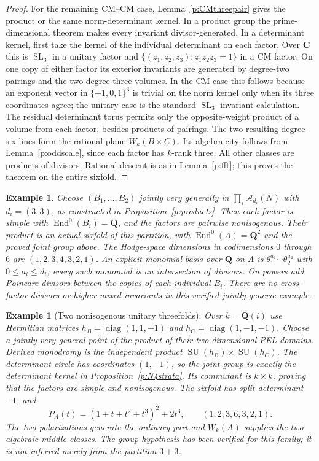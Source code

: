 \documentclass[10pt,reqno]{article}
\theoremstyle{emphasizedplain}
\theoremstyle{emphasizeddefinition}
\newtheorem{example}[theorem]{Example}
\theoremstyle{emphasizeddefinition}
\DeclareMathOperator{\End}{End}
\DeclareMathOperator{\SL}{SL}
\DeclareMathOperator{\SU}{SU}
\newcommand{\Q}{\mathbf Q}
\newcommand{\C}{\mathbf C}
\begin{document}
\begin{proof}
For the remaining CM--CM case, Lemma~\ref{p:CMthreepair} gives the
product or the same norm-determinant kernel. In a product group the
prime-dimensional theorem makes every invariant divisor-generated.
In a determinant kernel, first take the kernel of the individual
determinant on each factor. Over $\C$ this is $\SL_3$ in a unitary
factor and $\{(z_1,z_2,z_3):z_1z_2z_3=1\}$ in a CM factor.
On one copy of either factor its exterior invariants are generated by
degree-two pairings and the two degree-three volumes. In the CM case
this follows because an exponent vector in $\{-1,0,1\}^3$ is trivial
on the norm kernel only when its three coordinates agree; the unitary
case is the standard $\SL_3$ invariant calculation.
The residual determinant torus permits only the opposite-weight
product of a volume from each factor, besides products of pairings.
The two resulting degree-six lines form the rational plane
$W_k(B\times C)$. Its algebraicity follows from
Lemma~\ref{p:oddscale}, since each factor has $k$-rank three.
All other classes are products of divisors. Rational descent is as in
Lemma~\ref{p:fft}; this proves the theorem on the entire sixfold.
\end{proof}
\begin{example}
Choose $(B_1,\ldots,B_{2})$ jointly very generally in
$\prod_i\mathcal A_{d_i}(N)$ with $d_i=(3,3)$,
as constructed in Proposition~\ref{p:products}. Then each factor is
simple with $\End^0(B_i)=\Q$, and the factors are pairwise nonisogenous.
Their product is an actual sixfold of this partition, with
$\End^0(A)=\Q^{2}$ and the proved joint group above.
The Hodge-space dimensions in codimensions $0$ through $6$ are
$(1,2,3,4,3,2,1)$.
An explicit monomial basis over $\Q$ on $A$ is
$\theta_1^{a_1}\cdots\theta_{2}^{a_{2}}$ with
$0\leq a_i\leq d_i$; every such monomial is an intersection of divisors.
On powers add Poincare divisors between the copies of each individual
$B_i$. There are no cross-factor divisors or higher mixed invariants in
this verified jointly generic example.
\end{example}
\begin{example}[Two nonisogenous unitary threefolds]
Over $k=\Q(i)$ use Hermitian matrices
$h_B=\operatorname{diag}(1,1,-1)$ and
$h_C=\operatorname{diag}(1,-1,-1)$. Choose a jointly very general point
of the product of their two-dimensional PEL domains.
Derived monodromy is the independent product $\SU(h_B)\times\SU(h_C)$.
The determinant circle has coordinates $(1,-1)$, so the joint group
is exactly the determinant kernel in Proposition~\ref{p:N4strata}.
Its commutant is $k\times k$, proving that the factors are simple
and nonisogenous. The sixfold has split determinant $-1$, and
\[
 P_A(t)=(1+t+t^2+t^3)^2+2t^3,
 \qquad (1,2,3,6,3,2,1).
\]
The two polarizations generate the ordinary part and $W_k(A)$ supplies
the two algebraic middle classes. The group hypothesis has been verified
for this family; it is not inferred merely from the partition $3+3$.
\end{example}
\end{document}
